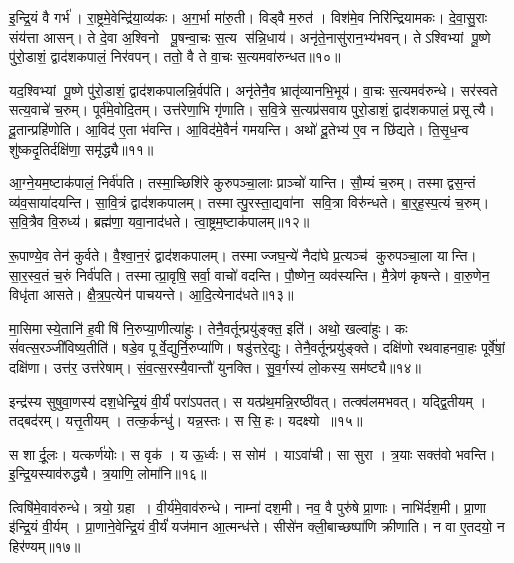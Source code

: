 इ॒न्द्रि॒यं वै गर्भ॑।
रा॒ष्ट्रमे॒वेन्द्रि॑या॒व्य॑कः।
अ॒ग॒र्भा मा॑रु॒ती।
विड्वै म॒रुत॑।
विश॑मे॒व निरि॑न्द्रियामकः।
दे॒वा॒सु॒राः संय॑त्ता आसन्।
ते दे॒वा अ॒श्विनो पू॒षन्वा॒चः स॒त्य स॑न्नि॒धाय॑।
अनृ॑ते॒नासु॑रान॒भ्य॑भवन्।
तेऽश्विभ्यां पू॒ष्णे पु॑रो॒डाशं॒ द्वाद॑शकपालं॒ निर॑वपन्।
ततो॒ वै ते वा॒चः स॒त्यमवा॑रुन्धत॥१०॥

यद॒श्विभ्यां पू॒ष्णे पु॑रो॒डाशं॒ द्वाद॑शकपालन्नि॒र्वप॑ति।
अनृ॑तेनै॒व भ्रातृ॑व्यानभि॒भूय॑।
वा॒चः स॒त्यमव॑रुन्धे।
सर॑स्वते सत्य॒वाचे॑ च॒रुम्।
पूर्व॑मे॒वोदि॒तम्।
उत्त॑रेणा॒भि गृ॑णाति।
स॒वि॒त्रे स॒त्यप्र॑सवाय पुरो॒डाशं॒ द्वाद॑शकपालं॒ प्रसूत्यै।
दू॒तान्प्रहि॑णोति।
आ॒विद॑ ए॒ता भ॑वन्ति।
आ॒विद॑मे॒वैनं॑ गमयन्ति।
अथो॑ दू॒तेभ्य॑ ए॒व न छि॑द्यते।
ति॒सृ॒ध॒न्व शु॑ष्कदृ॒तिर्दक्षि॑णा॒ समृ॑द्ध्यै॥११॥\anuvakamend[अ॒र्ध॒य॒ति॒ भ॒व॒त्य॒रु॒न्ध॒त॒ ग॒म॒य॒न्ति॒ द्वे च॑]

आ॒ग्ने॒यम॒ष्टाक॑पालं॒ निर्व॑पति।
तस्मा॒च्छिशि॑रे कुरुपञ्चा॒लाः प्राञ्चो॑ यान्ति।
सौ॒म्यं च॒रुम्।
तस्माद्वस॒न्तं व्य॑व॒साया॑दयन्ति।
सा॒वि॒त्रं द्वाद॑शकपालम्।
तस्मात्पु॒रस्ता॒द्यवा॑ना सवि॒त्रा विरु॑न्धते।
बा॒र्॒ह॒स्प॒त्यं च॒रुम्।
स॒वि॒त्रैव वि॒रुध्य॑।
ब्रह्म॑णा॒ यवा॒नाद॑धते।
त्वा॒ष्ट्रम॒ष्टाक॑पालम्॥१२॥

रू॒पाण्ये॒व तेन॑ कुर्वते।
वै॒श्वा॒न॒रं द्वाद॑शकपालम्।
तस्माज्जघ॒न्ये॑ नैदा॑घे प्र॒त्यञ्च॑ कुरुपञ्चा॒ला यान्ति।
सा॒र॒स्व॒तं च॒रुं निर्व॑पति।
तस्मात्प्रा॒वृषि॒ सर्वा॒ वाचो॑ वदन्ति।
पौ॒ष्णेन॒ व्यव॑स्यन्ति।
मै॒त्रेण॑ कृषन्ते।
वा॒रु॒णेन॒ विधृ॑ता आसते।
क्षै॒त्र॒प॒त्येन॑ पाचयन्ते।
आ॒दि॒त्येनाद॑धते॥१३॥

मा॒सिमास्ये॒तानि॑ ह॒वीषि॑ नि॒रुप्या॒णीत्या॑हुः।
तेनै॒वर्तून्प्रयु॑ङ्क्त॒ इति॑।
अथो॒ खल्वा॑हुः।
कः सं॑वत्स॒रञ्जी॑विष्य॒तीति॑।
षडे॒व पूर्वे॒द्युर्नि॒रुप्या॑णि।
षडु॑त्तरे॒द्युः।
तेनै॒वर्तून्प्रयु॑ङ्क्ते।
दक्षि॑णो रथवाहनवा॒हः पूर्वे॑षां॒ दक्षि॑णा।
उत्त॑र॒ उत्त॑रेषाम्।
सं॒व॒त्स॒रस्यै॒वान्तौ॑ युनक्ति।
सु॒व॒र्गस्य॑ लो॒कस्य॒ सम॑ष्ट्यै॥१४॥\anuvakamend[त्वा॒ष्ट्रम॒ष्टाक॑पालं दधते युन॒क्त्येकं॑ च]

इन्द्र॑स्य सुषुवा॒णस्य॑ दश॒धेन्द्रि॒यं वी॒र्यं॑ परा॑ऽपतत्।
स यत्प्र॑थ॒मन्नि॒रष्ठी॑वत्।
तत्क्व॑लमभवत्।
यद्द्वि॒तीयम्।
तद्बद॑रम्।
यत्तृ॒तीयम्।
तत्क॒र्कन्धु॑।
यन्न॒स्तः।
स सि॒हः।
यदक्ष्यो॥१५॥

स शार्दू॒लः।
यत्कर्ण॑योः।
स वृक॑।
य ऊ॒र्ध्वः।
स सोम॑।
याऽवा॑ची।
सा सुरा।
त्र॒याः सक्त॑वो भवन्ति।
इ॒न्द्रि॒यस्याव॑रुद्ध्यै।
त्र॒याणि॒ लोमा॑नि॥१६॥

त्विषि॑मे॒वाव॑रुन्धे।
त्रयो॒ ग्रहा।
वी॒र्य॑मे॒वाव॑रुन्धे।
नाम्ना॑ दश॒मी।
नव॒ वै पुरु॑षे प्रा॒णाः।
नाभि॑र्दश॒मी।
प्रा॒णा इ॑न्द्रि॒यं वी॒र्यम्।
प्रा॒णाने॒वेन्द्रि॒यं वी॒र्यं॑ यज॑मान आ॒त्मन्ध॑त्ते।
सीसे॑न क्ली॒बाच्छष्पा॑णि क्रीणाति।
न वा ए॒तदयो॒ न हिर॑ण्यम्॥१७॥

